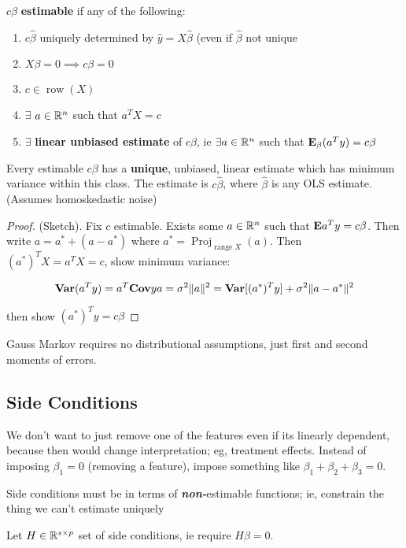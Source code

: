 \documentclass{article}
\newcommand{\range}{\operatorname{range}}
\begin{document}
\begin{definition}[Estimability]
    $c\beta$ \textbf{estimable} if any of the following:
    \begin{enumerate}
        \item $c\hat \beta $ uniquely determined by $\hat y = X\hat \beta $ (even if $\hat \beta$ not unique 
        \item $X\beta = 0 \implies c\beta = 0$
        \item $c \in \operatorname{row}(X)$
        \item $\exists$ $a\in \mathbb R^n$ such that $a^T X = c$
        \item $\exists$ \textbf{linear unbiased estimate} of $c\beta $, ie $\exists a\in \mathbb R^n$ such that $\mathbf{E}_\beta (a^T y) = c\beta $
    \end{enumerate}
\end{definition}
\begin{theorem}
    Every estimable $c\beta$ has a \textbf{unique}, unbiased, linear estimate which has minimum variance within this class. The estimate is $c\hat \beta$, where $\hat \beta$ is any OLS estimate. \\
    (Assumes homoskedastic noise) 
    \begin{proof}
        (Sketch). Fix $c$ estimable. Exists some $a \in \mathbb R^n$ such that $\mathbf{E} a^T y  = c\beta$. Then write $a = a^* + (a- a^*)$ where $a^* = \operatorname{Proj}_{\range X}(a)$. Then $(a^*)^T X = a^TX = c$, show minimum variance:
        
        $$\mathbf{Var} (a^T y) = a^T \mathbf{Cov} y a = \sigma^2 \| a\|^2 = \mathbf{Var} [(a^*)^T y]  + \sigma^2 \|a- a^*\|^2 $$
        
        then show $(a^*)^T y = c\beta $ 
    \end{proof}
    \end{theorem}

    \begin{fact}
        Gauss Markov requires no distributional assumptions, just first and second moments of errors.
    \end{fact}
    \subsection{Side Conditions}
    We don't want to just remove one of the features even if its linearly dependent, because then would change interpretation; eg, treatment effects. Instead of imposing $\beta_1=0$ (removing a feature), impose something like $\beta_1 + \beta_2 + \beta_3 = 0$. 
    \begin{fact}
        Side conditions must be in terms of \textbf{\textit{non-}}estimable functions; ie, constrain the thing we can't estimate uniquely
    \end{fact}
    Let $H\in \mathbb R^{s\times p}$ set of side conditions, ie require $H\beta = 0$. 
\end{document}
